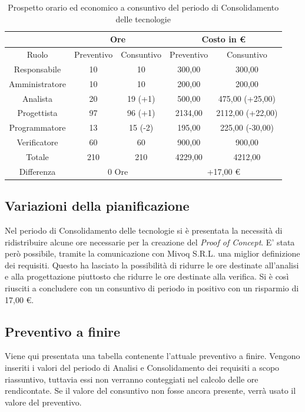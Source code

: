 \documentclass[./PianodiProgetto.tex]{subfiles}
\begin{document}
\begin{table}[H]
	\centering                   
       \begin{tabular}{|c|c|c|c|c|}
		\hline
		& \multicolumn{2}{c|}{Ore} & \multicolumn{2}{c|}{Costo in \euro{}}  \\ \hline
		Ruolo&Preventivo&Consuntivo&Preventivo&Consuntivo \\ \hline
		Responsabile&10&10&300,00&300,00  \\ \hline
		Amministratore&10&10&200,00&200,00 \\ \hline
		Analista&20&19 (+1)&500,00&475,00 (+25,00)  \\ \hline
		Progettista&97&96 (+1)&2134,00&2112,00 (+22,00) \\ \hline
		Programmatore&13&15 (-2)&195,00&225,00 (-30,00)  \\ \hline
		Verificatore&60&60&900,00&900,00  \\ \hline
		Totale&210&210&4229,00&4212,00  \\ \hline
		Differenza& \multicolumn{2}{c|}{0 Ore} & \multicolumn{2}{c|}{+17,00 \euro{}} \\ \hline
	\end{tabular}
	\caption{Prospetto orario ed economico a consuntivo del periodo di Consolidamento delle tecnologie}
\end{table}

\subsection{Variazioni della pianificazione}
Nel periodo di Consolidamento delle tecnologie si è presentata la necessità di ridistribuire alcune ore necessarie per la creazione del \textit{Proof of Concept}. E' stata però possibile, tramite la comunicazione con Mivoq S.R.L. una miglior definizione dei requisiti. Questo ha lasciato la possibilità di ridurre le ore destinate all'analisi e alla progettazione piuttosto che ridurre le ore destinate alla verifica. Si è così riusciti a concludere con un consuntivo di periodo in positivo con un risparmio di 17,00 \euro{}.

\subsection{Preventivo a finire}
Viene qui presentata una tabella contenente l'attuale preventivo a finire.
Vengono inseriti i valori del periodo di Analisi e Consolidamento dei requisiti a scopo riassuntivo, tuttavia essi non verranno conteggiati nel calcolo delle ore rendicontate. Se il valore del consuntivo non fosse ancora presente, verrà usato il valore del preventivo.
\end{document}
